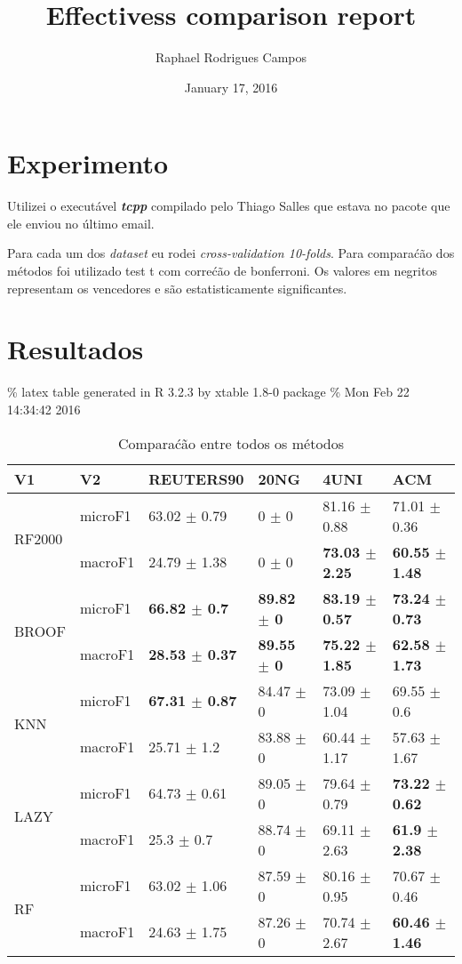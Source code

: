 \documentclass[]{article}
\title{Effectivess comparison report}
\author{Raphael Rodrigues Campos}
\date{January 17, 2016}
\begin{document}
\maketitle


\section{Experimento}\label{experimento}

Utilizei o executável \textbf{\emph{tcpp}} compilado pelo Thiago Salles
que estava no pacote que ele enviou no último email.

Para cada um dos \emph{dataset} eu rodei \emph{cross-validation
10-folds}. Para comparaćão dos métodos foi utilizado test t com correćão
de bonferroni. Os valores em negritos representam os vencedores e são
estatisticamente significantes.

\section{Resultados}\label{resultados}

\% latex table generated in R 3.2.3 by xtable 1.8-0 package \% Mon Feb
22 14:34:42 2016

\begin{table}[ht]
\centering
\begin{tabular}{llllll}
  \hline
V1 & V2 & REUTERS90 & 20NG & 4UNI & ACM \\ 
  \hline
\multirow{2}{*}{RF2000} & microF1 & 63.02 $\pm$  0.79 & 0 $\pm$  0 & 81.16 $\pm$  0.88 & 71.01 $\pm$  0.36 \\ 
   & macroF1 & 24.79 $\pm$  1.38 & 0 $\pm$  0 & \bf{73.03 $\pm$  2.25} & \bf{60.55 $\pm$  1.48} \\ 
  \multirow{2}{*}{BROOF} & microF1 & \bf{66.82 $\pm$  0.7} & \bf{89.82 $\pm$  0} & \bf{83.19 $\pm$  0.57} & \bf{73.24 $\pm$  0.73} \\ 
   & macroF1 & \bf{28.53 $\pm$  0.37} & \bf{89.55 $\pm$  0} & \bf{75.22 $\pm$  1.85} & \bf{62.58 $\pm$  1.73} \\ 
  \multirow{2}{*}{KNN} & microF1 & \bf{67.31 $\pm$  0.87} & 84.47 $\pm$  0 & 73.09 $\pm$  1.04 & 69.55 $\pm$  0.6 \\ 
   & macroF1 & 25.71 $\pm$  1.2 & 83.88 $\pm$  0 & 60.44 $\pm$  1.17 & 57.63 $\pm$  1.67 \\ 
  \multirow{2}{*}{LAZY} & microF1 & 64.73 $\pm$  0.61 & 89.05 $\pm$  0 & 79.64 $\pm$  0.79 & \bf{73.22 $\pm$  0.62} \\ 
   & macroF1 & 25.3 $\pm$  0.7 & 88.74 $\pm$  0 & 69.11 $\pm$  2.63 & \bf{61.9 $\pm$  2.38} \\ 
  \multirow{2}{*}{RF} & microF1 & 63.02 $\pm$  1.06 & 87.59 $\pm$  0 & 80.16 $\pm$  0.95 & 70.67 $\pm$  0.46 \\ 
   & macroF1 & 24.63 $\pm$  1.75 & 87.26 $\pm$  0 & 70.74 $\pm$  2.67 & \bf{60.46 $\pm$  1.46} \\ 
   \hline
\end{tabular}
\caption{Comparaćão entre todos os métodos} 
\end{table}
\end{document}

